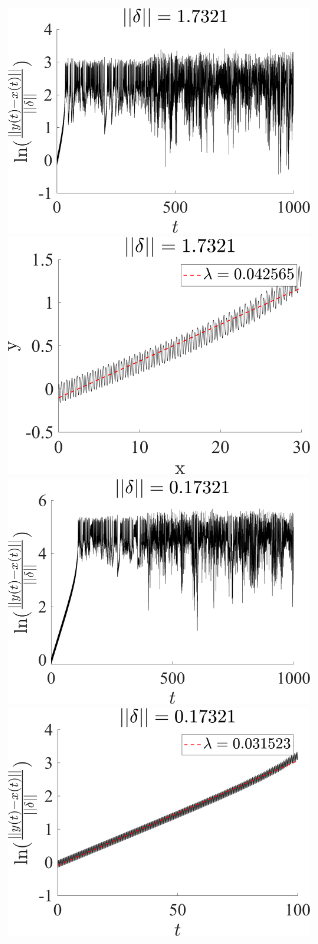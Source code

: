 \documentclass[11pt]{article}
\begin{document}
 
\begin{figure}[h]
\centering
\includegraphics[width=8cm]{Lorenz_r25.73682_trajectories_discp_delta4.png}
\includegraphics[width=8cm]{Lorenz_r25.73682_trajectories_discp2_delta4.png}
\includegraphics[width=8cm]{Lorenz_r25.73682_trajectories_discp.png}
\includegraphics[width=8cm]{Lorenz_r25.73682_trajectories_discp2.png}

\end{figure}
\end{document}
